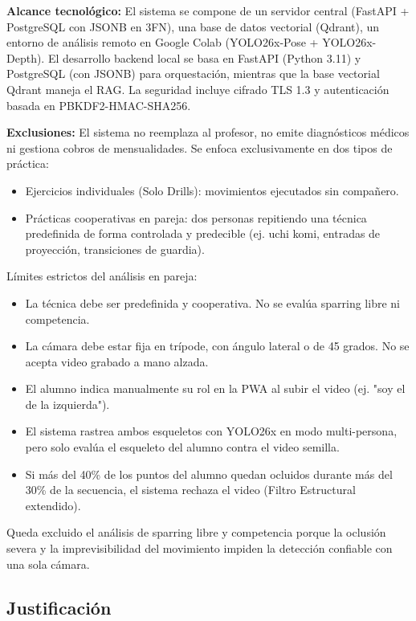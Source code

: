 \documentclass[12pt,letterpaper]{article}
\begin{document}
\vspace{0.3cm}
\textbf{Alcance tecnológico:} El sistema se compone de un servidor central (FastAPI + PostgreSQL con JSONB en 3FN), una base de datos vectorial (Qdrant), un entorno de análisis remoto en Google Colab (YOLO26x-Pose + YOLO26x-Depth). El desarrollo backend local se basa en FastAPI (Python 3.11) y PostgreSQL (con JSONB) para orquestación, mientras que la base vectorial Qdrant maneja el RAG. La seguridad incluye cifrado TLS 1.3 y autenticación basada en PBKDF2-HMAC-SHA256.

\vspace{0.3cm}
\textbf{Exclusiones:} El sistema no reemplaza al profesor, no emite diagnósticos médicos ni gestiona cobros de mensualidades. Se enfoca exclusivamente en dos tipos de práctica:
\begin{itemize}
    \item Ejercicios individuales (Solo Drills): movimientos ejecutados sin compañero.
    \item Prácticas cooperativas en pareja: dos personas repitiendo una técnica predefinida de forma controlada y predecible (ej. uchi komi, entradas de proyección, transiciones de guardia).
\end{itemize}

Límites estrictos del análisis en pareja:
\begin{itemize}
    \item La técnica debe ser predefinida y cooperativa. No se evalúa sparring libre ni competencia.
    \item La cámara debe estar fija en trípode, con ángulo lateral o de 45 grados. No se acepta video grabado a mano alzada.
    \item El alumno indica manualmente su rol en la PWA al subir el video (ej. "soy el de la izquierda").
    \item El sistema rastrea ambos esqueletos con YOLO26x en modo multi-persona, pero solo evalúa el esqueleto del alumno contra el video semilla.
    \item Si más del 40\% de los puntos del alumno quedan ocluidos durante más del 30\% de la secuencia, el sistema rechaza el video (Filtro Estructural extendido).
\end{itemize}

Queda excluido el análisis de sparring libre y competencia porque la oclusión severa y la imprevisibilidad del movimiento impiden la detección confiable con una sola cámara.

\subsection{Justificación}
\end{document}
